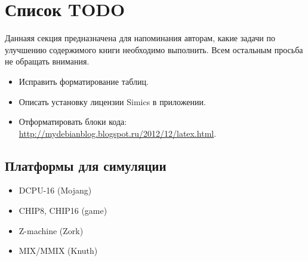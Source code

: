 \section*{Список TODO}

Даннаяя секция предназначена для напоминания авторам, какие задачи по улучшению содержимого книги необходимо выполнить. Всем остальным просьба не обращать внимания.

\begin{itemize}
    \item Исправить форматирование таблиц.
	\item Описать установку лицензии Simics в приложении.
	\item Отформатировать блоки кода: \url{http://mydebianblog.blogspot.ru/2012/12/latex.html}.
\end{itemize}


\subsection*{Платформы для симуляции}

\begin{itemize}
    \item DCPU-16 (Mojang)
	\item CHIP8, CHIP16 (game)
	\item Z-machine (Zork)
	\item MIX/MMIX (Knuth)
\end{itemize}
